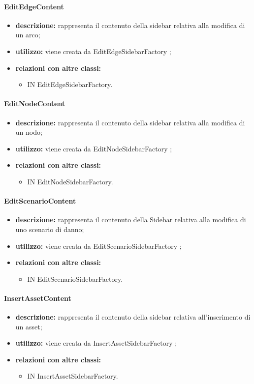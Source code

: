 \paragraph{EditEdgeContent}
\begin{itemize}
	\item \textbf{descrizione:} rappresenta il contenuto della sidebar relativa alla modifica di un arco;
	\item \textbf{utilizzo:} viene creata da EditEdgeSidebarFactory ;
	\item \textbf{relazioni con altre classi:} 
	\begin{itemize}
		\item IN EditEdgeSidebarFactory.
	\end{itemize}
\end{itemize}
\paragraph{EditNodeContent}
\begin{itemize}
	\item \textbf{descrizione:} rappresenta il contenuto della sidebar relativa alla modifica di un nodo;
	\item \textbf{utilizzo:} viene creata da EditNodeSidebarFactory ;
	\item \textbf{relazioni con altre classi:} 
	\begin{itemize}
		\item IN EditNodeSidebarFactory.
	\end{itemize}
\end{itemize}
\paragraph{EditScenarioContent}
\begin{itemize}
	\item \textbf{descrizione:} rappresenta il contenuto della Sidebar relativa alla modifica di uno scenario di danno;
	\item \textbf{utilizzo:} viene creata da EditScenarioSidebarFactory ;
	\item \textbf{relazioni con altre classi:} 
	\begin{itemize}
		\item IN EditScenarioSidebarFactory.
	\end{itemize}
\end{itemize}
\paragraph{InsertAssetContent}
\begin{itemize}
	\item \textbf{descrizione:} rappresenta il contenuto della sidebar relativa all'inserimento di un asset;
	\item \textbf{utilizzo:} viene creata da InsertAssetSidebarFactory ;
	\item \textbf{relazioni con altre classi:} 
	\begin{itemize}
		\item IN InsertAssetSidebarFactory.
	\end{itemize}
\end{itemize}

